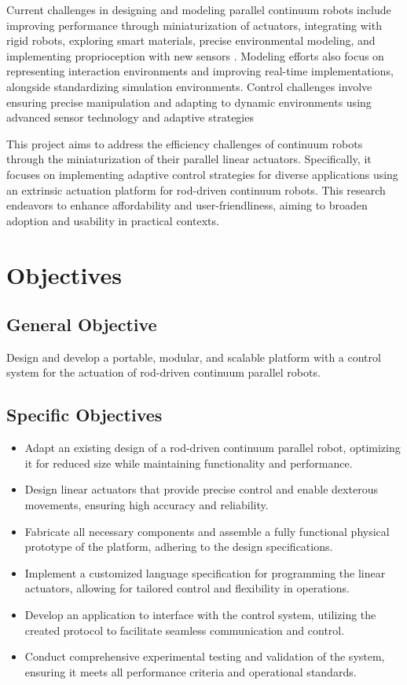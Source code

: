 \par Current challenges in designing and modeling parallel continuum robots include improving performance through miniaturization of actuators, integrating with rigid robots, exploring smart materials, precise environmental modeling, and implementing proprioception with new sensors \cite{russo2023}. Modeling efforts also focus on representing interaction environments and improving real-time implementations, alongside standardizing simulation environments. Control challenges involve ensuring precise manipulation and adapting to dynamic environments using advanced sensor technology and adaptive strategies

\par This project aims to address the efficiency challenges of continuum robots through the miniaturization of their parallel linear actuators. Specifically, it focuses on implementing adaptive control strategies for diverse applications using an extrinsic actuation platform for rod-driven continuum robots. This research endeavors to enhance affordability and user-friendliness, aiming to broaden adoption and usability in practical contexts.


\section{Objectives}

\subsection{General Objective}
Design and develop a portable, modular, and scalable platform with a control system for the actuation of rod-driven continuum parallel robots.

\subsection{Specific Objectives}
\begin{itemize}
    \item Adapt an existing design of a rod-driven continuum parallel robot, optimizing it for reduced size while maintaining functionality and performance.
    \item Design linear actuators that provide precise control and enable dexterous movements, ensuring high accuracy and reliability.
    \item Fabricate all necessary components and assemble a fully functional physical prototype of the platform, adhering to the design specifications.
    \item Implement a customized language specification for programming the linear actuators, allowing for tailored control and flexibility in operations.
    \item Develop an application to interface with the control system, utilizing the created protocol to facilitate seamless communication and control.
    \item Conduct comprehensive experimental testing and validation of the system, ensuring it meets all performance criteria and operational standards.
\end{itemize}